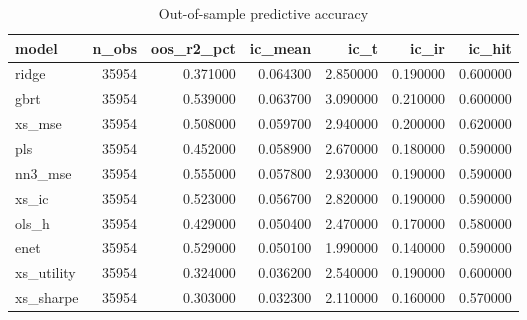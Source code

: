 \begin{table}
\caption{Out-of-sample predictive accuracy}
\label{tab:t1_statistical}
\begin{tabular}{lrrrrrr}
\toprule
model & n\_obs & oos\_r2\_pct & ic\_mean & ic\_t & ic\_ir & ic\_hit \\
\midrule
ridge & 35954 & 0.371000 & 0.064300 & 2.850000 & 0.190000 & 0.600000 \\
gbrt & 35954 & 0.539000 & 0.063700 & 3.090000 & 0.210000 & 0.600000 \\
xs\_mse & 35954 & 0.508000 & 0.059700 & 2.940000 & 0.200000 & 0.620000 \\
pls & 35954 & 0.452000 & 0.058900 & 2.670000 & 0.180000 & 0.590000 \\
nn3\_mse & 35954 & 0.555000 & 0.057800 & 2.930000 & 0.190000 & 0.590000 \\
xs\_ic & 35954 & 0.523000 & 0.056700 & 2.820000 & 0.190000 & 0.590000 \\
ols\_h & 35954 & 0.429000 & 0.050400 & 2.470000 & 0.170000 & 0.580000 \\
enet & 35954 & 0.529000 & 0.050100 & 1.990000 & 0.140000 & 0.590000 \\
xs\_utility & 35954 & 0.324000 & 0.036200 & 2.540000 & 0.190000 & 0.600000 \\
xs\_sharpe & 35954 & 0.303000 & 0.032300 & 2.110000 & 0.160000 & 0.570000 \\
\bottomrule
\end{tabular}
\end{table}
